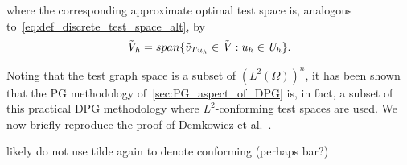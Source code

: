 where the corresponding approximate optimal test space is, analogous to~\eqref{eq:def_discrete_test_space_alt}, by
\begin{align} \label{eq:def_discrete_test_space_alt_approx}
\tilde{\mathit{{{V}}}}_h = span \{ \tilde{v}_{T u_h} \in \tilde{\mathit{{{V}}}} : u_h \in \mathit{{{U}}}_h \}.
\end{align}


Noting that the test graph space is a subset of $(L^2(\Omega))^n$, it has been shown that the PG methodology
of~\autoref{sec:PG_aspect_of_DPG} is, in fact, a subset of this practical DPG methodology where $L^2$-conforming test
spaces are used.  We now briefly reproduce the proof of Demkowicz et
al.~\cite[Section ]{Demkowicz2014_overview}.

likely do not use tilde again to denote conforming (perhaps bar?)
